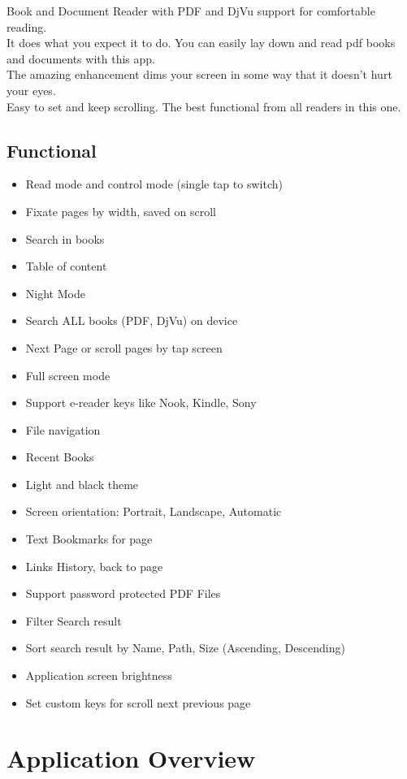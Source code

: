\documentclass[14pt,letter]{article}
\begin{document}
Book and Document Reader with PDF and DjVu support for comfortable reading.\\
It does what you expect it to do. You can easily lay down and read pdf books and documents with this app.\\ 
The amazing enhancement dims your screen in some way that it doesn't hurt your eyes. \\
Easy to set and keep scrolling. The best functional from all readers in this one.

\subsection{Functional}
\begin{itemize}
\item Read mode and control mode (single tap to switch)
\item Fixate pages by width, saved on scroll
\item Search in books 
\item Table of content
\item Night Mode
\item Search ALL books (PDF, DjVu) on device
\item Next Page or scroll pages by tap screen 
\item Full screen mode
\item Support e-reader keys like Nook, Kindle, Sony
\item File navigation
\item Recent Books
\item Light and black theme
\item Screen orientation: Portrait, Landscape, Automatic
\item Text Bookmarks for page
\item Links History, back to page
\item Support password protected PDF Files
\item Filter Search result
\item Sort search result by Name, Path, Size (Ascending, Descending)
\item Application screen brightness
\item Set custom keys for scroll next previous page
\end{itemize}


\newpage
\section{Application Overview}
\end{document}
